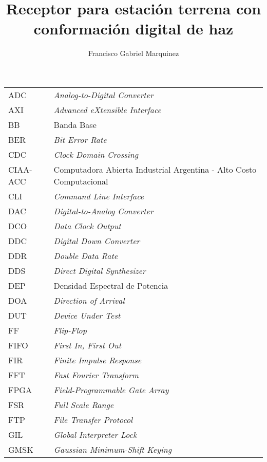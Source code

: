 \documentclass[screen, pagebackref,oneside]{ibtesis}
\title{Receptor para estación terrena con conformación digital de haz}
\author{Francisco Gabriel Marquinez}
\begin{document}
\begin{preliminary}


    \begin{abreviaturas}
        \begin{longtable}{ll}
            ADC &   \textit{Analog-to-Digital Converter} \\
            AXI &   \textit{Advanced eXtensible Interface}  \\
            BB  &   Banda Base  \\
            BER &   \textit{Bit Error Rate} \\
            CDC &   \textit{Clock Domain Crossing}  \\
            CIAA-ACC & Computadora Abierta Industrial Argentina - Alto Costo Computacional  \\
            CLI &   \textit{Command Line Interface} \\  
            DAC &   \textit{Digital-to-Analog Converter}    \\
            DCO &   \textit{Data Clock Output}  \\
            DDC &   \textit{Digital Down Converter} \\
            DDR &   \textit{Double Data Rate}   \\
            DDS &   \textit{Direct Digital Synthesizer} \\
            DEP &   Densidad Espectral de Potencia \\   
            DOA &   \textit{Direction of Arrival}   \\
            DUT &   \textit{Device Under Test}  \\
            FF  &   \textit{Flip-Flop}  \\
            FIFO &  \textit{First In, First Out}    \\
            FIR &   \textit{Finite Impulse Response}    \\
            FFT &   \textit{Fast Fourier Transform} \\
            FPGA &  \textit{Field-Programmable Gate Array} \\
            FSR &   \textit{Full Scale Range}   \\
            FTP &   \textit{File Transfer Protocol} \\
            GIL &   \textit{Global Interpreter Lock}    \\
            GMSK &  \textit{Gaussian Minimum-Shift Keying} \\

\end{longtable}
\end{abreviaturas}
\end{preliminary}
\end{document}
